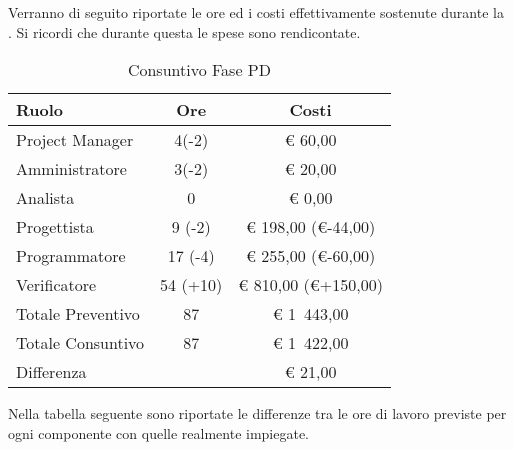 			Verranno di seguito riportate le ore ed i costi effettivamente sostenute durante la . Si ricordi che durante questa  le spese sono rendicontate.
			\begin{table}[H]
				\begin{center}
					\begin{tabular}{| l | c | c |}
						\hline
						Ruolo 				& Ore 		& Costi  \\ \hline
						
						Project Manager		& 4(-2) 		& \euro{} 60,00 	\\
						Amministratore 		& 3(-2) 		& \euro{} 20,00 	\\
						Analista			& 0			& \euro{} 0,00	\\
						Progettista 		& 9 (-2)		& \euro{} 198,00 (\euro{}-44,00)  	\\
						Programmatore		& 17 (-4) 		& \euro{} 255,00 (\euro{}-60,00)	\\
						Verificatore		& 54 (+10)		& \euro{} 810,00 (\euro{}+150,00) 	\\ \hline \hline
						
						Totale Preventivo	& 87 		& \euro{} 1~443,00 	\\ \hline
						Totale Consuntivo	&  87 			& \euro{}  1~422,00 	\\ \hline
						Differenza			&  			& \euro{}  	21,00\\ \hline
					\end{tabular}
				\end{center}
				\caption{Consuntivo Fase PD}
			\end{table}


			Nella tabella seguente sono riportate le differenze tra le ore di lavoro previste per ogni componente con quelle realmente impiegate.

